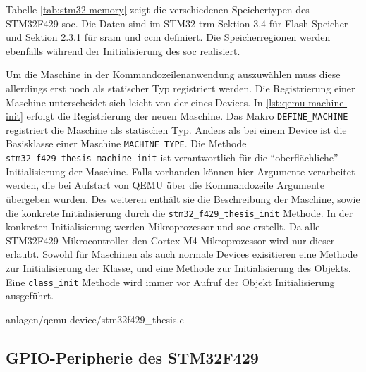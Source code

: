 Tabelle \ref{tab:stm32-memory} zeigt die verschiedenen Speichertypen des
STM32F429-\ac{soc}.
Die Daten sind im STM32-\ac{trm} Sektion 3.4 für Flash-Speicher und Sektion
2.3.1 für \ac{sram} und \ac{ccm} definiert\cite{Stm32F4Trm}.
Die Speicherregionen werden ebenfalls während der Initialisierung des \ac{soc}
realisiert.

Um die Maschine in der Kommandozeilenanwendung auszuwählen muss diese
allerdings erst noch als statischer Typ registriert werden.
Die Registrierung einer Maschine unterscheidet sich leicht von der eines
Devices.
In \ref{lst:qemu-machine-init} erfolgt die Registrierung der neuen Maschine.
Das Makro \texttt{DEFINE\_MACHINE} registriert die Maschine als statischen Typ.
Anders als bei einem Device ist die Basisklasse einer Maschine
\texttt{MACHINE\_TYPE}.
Die Methode \texttt{stm32\_f429\_thesis\_machine\_init} ist verantwortlich für
die \enquote{oberflächliche} Initialisierung der Maschine.
Falls vorhanden können hier Argumente verarbeitet werden, die bei Aufstart von
QEMU über die Kommandozeile Argumente übergeben wurden.
Des weiteren enthält sie die Beschreibung der Maschine, sowie die konkrete
Initialisierung durch die \texttt{stm32\_f429\_thesis\_init} Methode.
In der konkreten Initialisierung werden Mikroprozessor und \ac{soc} erstellt.
Da alle STM32F429 Mikrocontroller den Cortex-M4 Mikroprozessor wird nur dieser
erlaubt.
Sowohl für Maschinen als auch normale Devices exisitieren eine Methode zur
Initialisierung der Klasse, und eine Methode zur Initialisierung des Objekts.
Eine \texttt{class\_init} Methode wird immer vor Aufruf der Objekt
Initialisierung ausgeführt.

\begin{minipage}{\linewidth}

                {anlagen/qemu-device/stm32f429_thesis.c}
\end{minipage}

\subsection{GPIO-Peripherie des STM32F429}


